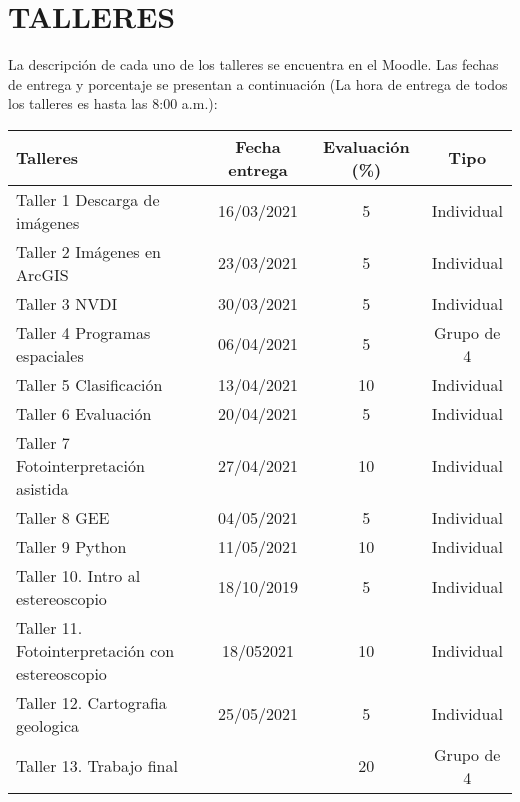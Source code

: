 \documentclass[a4paper,twoside,11pt,]{article}
\begin{document}
\section{TALLERES}
La descripción de cada uno de los talleres se encuentra en el Moodle. Las fechas de entrega y porcentaje se presentan a continuación (La hora de entrega de todos los talleres es hasta las 8:00 a.m.):\\
\begin{table}[!hbt]
\label{tab-marks}
\begin{tabular}{|l|c|c|c|}
\hline {\bf Talleres} & {\bf Fecha entrega} & {\bf Evaluación (\%)} & {\bf Tipo} \\
\hline Taller 1 Descarga de imágenes & 16/03/2021 &  5 & Individual\\
\hline Taller 2 Imágenes en ArcGIS &  23/03/2021& 5 & Individual\\
\hline Taller 3 NVDI & 30/03/2021  & 5 & Individual\\
\hline Taller 4 Programas espaciales  & 06/04/2021 &  5 & Grupo de 4\\
\hline Taller 5 Clasificación &  13/04/2021 & 10 & Individual\\
\hline Taller 6 Evaluación & 20/04/2021  & 5 & Individual\\
\hline Taller 7 Fotointerpretación asistida & 27/04/2021 &  10 & Individual\\
\hline Taller 8 GEE &  04/05/2021& 5 & Individual\\
\hline Taller 9 Python  & 11/05/2021  & 10 & Individual\\
\hline Taller 10. Intro al estereoscopio & 18/10/2019 &  5 & Individual\\
\hline Taller 11. Fotointerpretación con estereoscopio &  18/052021 & 10 & Individual\\
\hline Taller 12. Cartografia geologica & 25/05/2021  & 5 & Individual\\
\hline Taller 13. Trabajo final & & 20 & Grupo de 4\\
\hline
\end{tabular}
\end{table}
\end{document}
